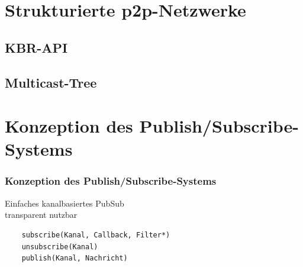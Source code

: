 \documentclass[professionalfonts]{beamer}
\begin{document}
\section{Strukturierte p2p-Netzwerke}
\subsection{KBR-API}

\subsection{Multicast-Tree}

\section{Konzeption des Publish/Subscribe-Systems}
\begin{frame}[fragile]
	\frametitle{Konzeption des Publish/Subscribe-Systems}
	Einfaches kanalbasiertes PubSub\\	transparent nutzbar \\

	\begin{verbatim}
	subscribe(Kanal, Callback, Filter*)
	unsubscribe(Kanal)
	publish(Kanal, Nachricht)
	\end{verbatim}

\end{frame}
\end{document}
